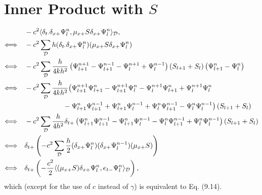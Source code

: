 \documentclass[dvipsnames]{article}
\def\dxp{\delta_{x+}}
\def\mup{\mu_{x+}}
\def\Psilp{\Psi_{l+1}^n}
\def\Psinp{\Psi_l^{n+1}}
\def\Psinm{\Psi_l^{n-1}}
\def\Psiln{\Psi_l^n}
\def\dtd{\delta_{t\cdot}}
\begin{document}
\section{Inner Product with $S$}\label{app:proof}
\begin{equation}
\begin{aligned}
        &-c^2\langle\dtd\dxp\Psiln, \mup S\dxp\Psiln\rangle_\mathcal{D},\\
        \Longleftrightarrow \quad
        &-c^2\sum_\mathcal{D} h(\dtd\dxp\Psiln)( \mup S\dxp\Psiln)\\
        \Longleftrightarrow \quad & -c^2\sum_\mathcal{D}\frac{h}{4kh^2}\left(\Psinplp - \Psinmlp-\Psinp+\Psinm\right)\left(S_{l+1} + S_l\right)\left(\Psilp-\Psiln\right)\\
        \Longleftrightarrow \quad
        & -c^2\sum_\mathcal{D}\frac{h}{4kh^2}\big(\Psinplp\Psilp-\Psinplp\Psiln-\Psinp\Psilp+\Psinp\Psiln\\
        &\qquad\qquad\qquad\!\!\!\!\!\;-\Psilp\Psinmlp+\Psilp\Psinm+\Psiln\Psinmlp-\Psiln\Psinm\big)\left(S_{l+1}+S_l\right)\\
        \Longleftrightarrow \quad
        & -c^2\sum_\mathcal{D}\frac{h}{4h^2}\delta_{t+}\left(\Psilp\Psinmlp-\Psilp\Psinm-\Psiln\Psinmlp+\Psiln\Psinm\right)\left(S_{l+1}+S_l\right)\\
        \Longleftrightarrow \quad
        & \delta_{t+}\left(-c^2\sum_\mathcal{D}\frac{h}{2}(\dxp\Psiln)(\dxp\Psinm)(\mup S)\right)
        \\
        \Longleftrightarrow \quad
        & \delta_{t+}\left(-\frac{c^2}{2}\langle(\mup S)\dxp\Psiln,e_{t-}\Psiln\rangle_\mathcal{D}\right),
    \end{aligned}
\end{equation}
which (except for the use of $c$ instead of $\gamma$) is equivalent to Eq. (9.14).
\end{document}
